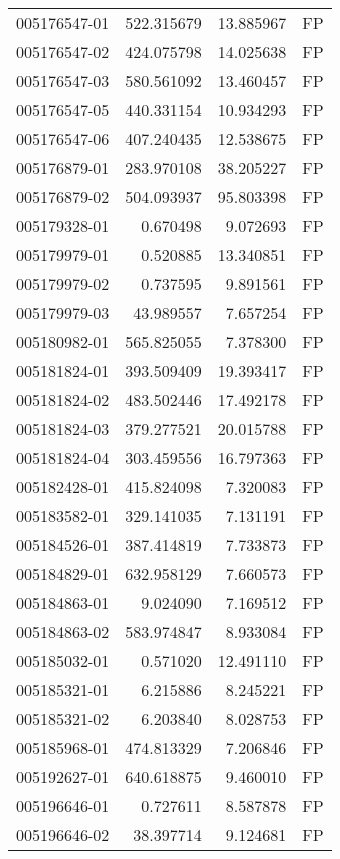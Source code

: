\begin{tabular}{lrrl}
005176547-01 &  522.315679 &    13.885967 &   FP \\
005176547-02 &  424.075798 &    14.025638 &   FP \\
005176547-03 &  580.561092 &    13.460457 &   FP \\
005176547-05 &  440.331154 &    10.934293 &   FP \\
005176547-06 &  407.240435 &    12.538675 &   FP \\
005176879-01 &  283.970108 &    38.205227 &   FP \\
005176879-02 &  504.093937 &    95.803398 &   FP \\
005179328-01 &    0.670498 &     9.072693 &   FP \\
005179979-01 &    0.520885 &    13.340851 &   FP \\
005179979-02 &    0.737595 &     9.891561 &   FP \\
005179979-03 &   43.989557 &     7.657254 &   FP \\
005180982-01 &  565.825055 &     7.378300 &   FP \\
005181824-01 &  393.509409 &    19.393417 &   FP \\
005181824-02 &  483.502446 &    17.492178 &   FP \\
005181824-03 &  379.277521 &    20.015788 &   FP \\
005181824-04 &  303.459556 &    16.797363 &   FP \\
005182428-01 &  415.824098 &     7.320083 &   FP \\
005183582-01 &  329.141035 &     7.131191 &   FP \\
005184526-01 &  387.414819 &     7.733873 &   FP \\
005184829-01 &  632.958129 &     7.660573 &   FP \\
005184863-01 &    9.024090 &     7.169512 &   FP \\
005184863-02 &  583.974847 &     8.933084 &   FP \\
005185032-01 &    0.571020 &    12.491110 &   FP \\
005185321-01 &    6.215886 &     8.245221 &   FP \\
005185321-02 &    6.203840 &     8.028753 &   FP \\
005185968-01 &  474.813329 &     7.206846 &   FP \\
005192627-01 &  640.618875 &     9.460010 &   FP \\
005196646-01 &    0.727611 &     8.587878 &   FP \\
005196646-02 &   38.397714 &     9.124681 &   FP \\

\end{tabular}

